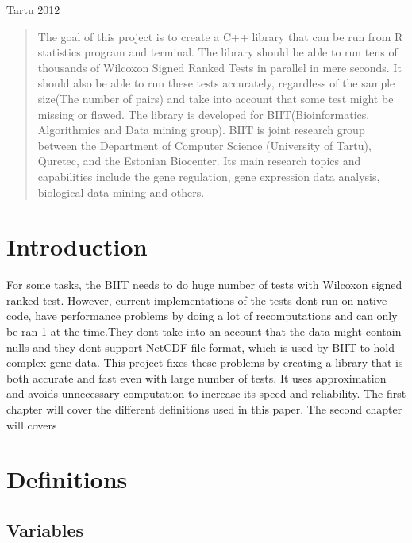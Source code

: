 \documentclass[12pt]{article}
\begin{document}
\vfill
\centerline{Tartu 2012}

\newpage

\tableofcontents

\pagebreak

\begin{abstract}
The goal of this project is to create a C++ library that can be run from R statistics program and terminal. The library should be able to run tens of thousands of Wilcoxon Signed Ranked Tests in parallel in mere seconds. It should also be able to run these tests accurately, regardless of the sample size(The number of pairs) and take into account that some test might be missing or flawed. The library is developed for BIIT(Bioinformatics, Algorithmics and Data mining group). BIIT is joint research group between the Department of Computer Science (University of Tartu), Quretec, and the Estonian Biocenter. Its main research topics and capabilities include the gene regulation, gene expression data analysis, biological data mining and others.
\end{abstract}

\newpage

\section{Introduction}
For some tasks, the BIIT needs to do huge number of tests with Wilcoxon signed ranked test. However, current implementations of the tests dont run on native code, have performance problems by doing a lot of recomputations and can only be ran 1 at the time.They dont take into an account that the data might contain nulls and they dont support NetCDF file format, which is used by BIIT to hold complex gene data.
This project fixes these problems by creating a library that is both accurate and fast even with large number of tests. It uses approximation and avoids unnecessary computation to increase its speed and reliability.
The first chapter will cover the different definitions used in this paper. The second chapter will covers

\newpage

\section{Definitions}

\subsection{Variables}
\end{document}
